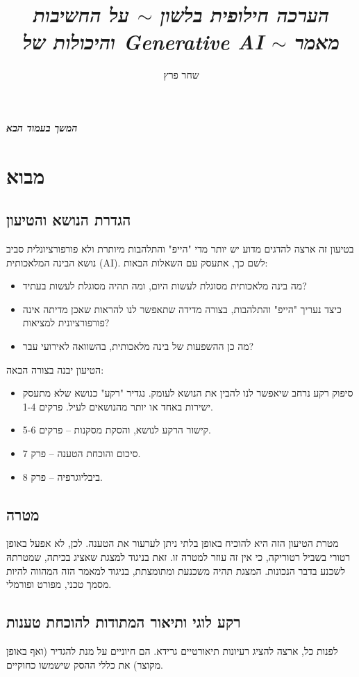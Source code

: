 \documentclass[]{article}
\author{שחר פרץ}
\title{\textit{הערכה חילופית בלשון $\sim$ על החשיבות והיכולות של Generative AI $\sim$ מאמר}}
\newcommand\npage {\vfil {\hfil \textbf{\textit{המשך בעמוד הבא}}} \hfil \vfil \pagebreak}
\theoremstyle{definition}
\begin{document}
	\maketitle
	\tableofcontents
	
	\npage
	\section{מבוא}
	\begin{multicols}{2}
		\subsection{הגדרת הנושא והטיעון}
		בטיעון זה ארצה להדגים מדוע יש יותר מדי "הייפ" והתלהבות מיותרת ולא פורפורציונלית סביב נושא הבינה המלאכותית (AI). לשם כך, אתעסק עם השאלות הבאות: 
		\begin{itemize}
			\item מה בינה מלאכותית מסוגלת לעשות היום, ומה תהיה מסוגלת לעשות בעתיד? 
			\item כיצד נעריך "הייפ" והתלהבות, בצורה מדידה שתאפשר לנו להראות שאכן מדיתה אינה פורפורציונית למציאות? 
			\item מה כן ההשפעות של בינה מלאכותית, בהשוואה לאירועי עבר? 
		\end{itemize}
		הטיעון יבנה בצורה הבאה: 
		\begin{itemize}
			\item סיפוק רקע נרחב שיאפשר לנו להבין את הנושא לעומק. נגדיר "רקע" כנושא שלא מתעסק ישירות באחד או יותר מהנושאים לעיל. פרקים 1-4. 
			\item קישור הרקע לנושא, והסקת מסקנות – פרקים 5-6. 
			\item סיכום והוכחת הטענה – פרק 7. 
			\item ביבליוגרפיה – פרק 8. 
		\end{itemize}
		
		\subsection{מטרה}
		מטרת הטיעון הזה היא להוכיח באופן בלתי ניתן לערעור את הטענה. לכן, לא אפעל באופן רטורי בשביל רטוריקה, כי אין זה עוזר למטרה זו. זאת בניגוד למצגת שאציג בכיתה, שמטרתהּ לשכנע בדבר הנכונות. המצגת תהיה משכנעת ומתומצתת, בניגוד למאמר הזה המהווה להיות מסמך טכני, מפורט ופורמלי. 
		
		\subsection{רקע לוגי ותיאור המתודות להוכחת טענות}
		לפנות כל, ארצה להציג רעיונות תיאורטיים גרידא. הם חיוניים על מנת להגדיר (ואף באופן מקוצר) את כללי ההסק שישמשו כחוקיים. 
		

\end{multicols}
\end{document}
